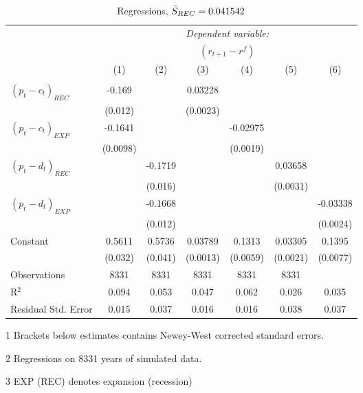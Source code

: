 \begin{table}[H]
\centering   
  \caption{Regressions, $\Bar{S}_{REC} = 0.041542$}           
  \label{tab:regress1}     
  \begin{threeparttable}
\begin{tabular}{@{\hspace{5pt}}l@{\hspace{5pt}}cccccc} 
\toprule 
 & \multicolumn{6}{c}{\textit{Dependent variable:}} \\ 
 & \multicolumn{6}{c}{$\left(r_{t+1}-r^f\right)$} \\ 
 \cmidrule(rr){2-7}
 & (1) & (2) & (3) & (4) & (5) & (6) \\ 
\midrule  
\\[-2.1ex] $\left( p_t - c_t \right)_{REC}$ &-0.169& &0.03228 & & &\\ 
  & (0.012) & &(0.0023) & & & \\ 
 \addlinespace 
  $\left( p_t - c_t \right)_{EXP}$ &-0.1641  &    & &-0.02975 & &  \\ 
  & (0.0098) & & &(0.0019) & & \\ 
 \addlinespace 
  $\left( p_t - d_t \right)_{REC}$ & &-0.1719& & & 0.03658  &   \\ 
                                   & &  (0.016) & & & (0.0031) &    \\ 
 \addlinespace 
  $\left( p_t - d_t \right)_{EXP}$ & &   -0.1668& & & &-0.03338 \\ 
                                   & &  (0.012) & & & &(0.0024) \\ 
 \addlinespace 
 Constant &0.5611 &0.5736&0.03789 &0.1313 &0.03305 &0.1395 \\ 
          &(0.032) &(0.041)&(0.0013)&(0.0059)&(0.0021)&(0.0077) \\ 
 \addlinespace 
\midrule  
Observations & 8331 & 8331& 8331&8331&8331\\
R$^{2}$ &0.094 & 0.053&0.047&0.062&0.026&0.035 \\ 
Residual Std. Error &0.015 & 0.037&0.016&0.016&0.038&0.037 \\ 
\bottomrule 
\end{tabular} 
\begin{tablenotes}
\footnotesize{
\item[1] Brackets below estimates contains Newey-West corrected standard errors. 
\item[2] Regressions on 8331 years of simulated data.
\item[3] EXP (REC) denotes expansion (recession)
}
\end{tablenotes}
\end{threeparttable}
\end{table} 
